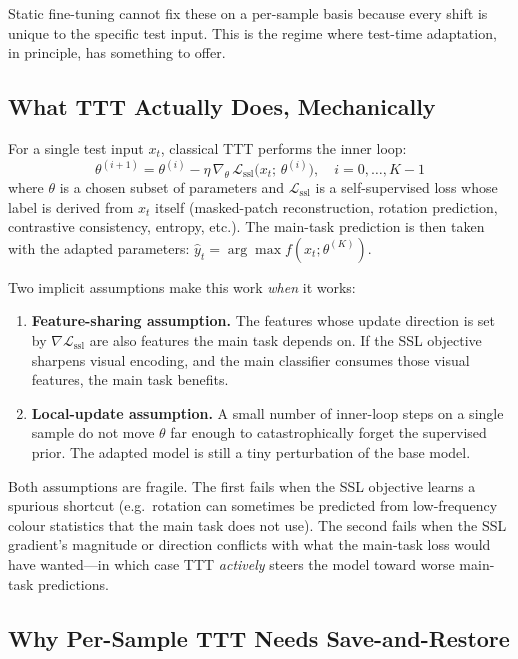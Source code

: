 \documentclass[conference]{IEEEtran}
\begin{document}
Static fine-tuning cannot fix these on a per-sample basis because every
shift is unique to the specific test input. This is the regime where
test-time adaptation, in principle, has something to offer.

\subsection{What TTT Actually Does, Mechanically}

For a single test input $x_t$, classical TTT performs the inner loop:
\begin{equation}
\theta^{(i+1)} = \theta^{(i)} - \eta\, \nabla_{\theta}\,
\mathcal{L}_{\mathrm{ssl}}\bigl(x_t;\, \theta^{(i)}\bigr),\quad i=0,\dots,K-1
\end{equation}
where $\theta$ is a chosen subset of parameters and $\mathcal{L}_{\mathrm{ssl}}$
is a self-supervised loss whose label is derived from $x_t$ itself
(masked-patch reconstruction, rotation prediction, contrastive consistency,
entropy, etc.). The main-task prediction is then taken with the adapted
parameters: $\hat{y}_t = \arg\max f(x_t; \theta^{(K)})$.

Two implicit assumptions make this work \emph{when} it works:

\begin{enumerate}
\item \textbf{Feature-sharing assumption.} The features whose update
direction is set by $\nabla \mathcal{L}_{\mathrm{ssl}}$ are also features
the main task depends on. If the SSL objective sharpens visual encoding,
and the main classifier consumes those visual features, the main task
benefits.
\item \textbf{Local-update assumption.} A small number of inner-loop
steps on a single sample do not move $\theta$ far enough to catastrophically
forget the supervised prior. The adapted model is still a tiny perturbation
of the base model.
\end{enumerate}

Both assumptions are fragile. The first fails when the SSL objective
learns a spurious shortcut (e.g.\ rotation can sometimes be predicted
from low-frequency colour statistics that the main task does not use).
The second fails when the SSL gradient's magnitude or direction conflicts
with what the main-task loss would have wanted---in which case TTT
\emph{actively} steers the model toward worse main-task predictions.

\subsection{Why Per-Sample TTT Needs Save-and-Restore}
\end{document}
